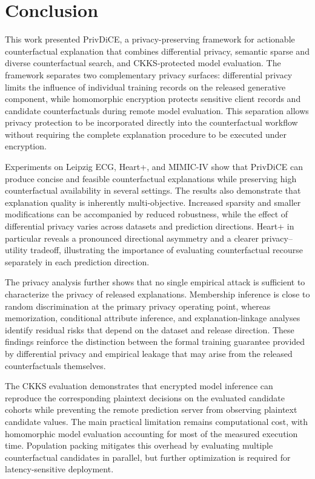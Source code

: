 \documentclass[preprint,12pt]{elsarticle}
\begin{document}
\section{Conclusion}
\label{sec:conclusion}

This work presented PrivDiCE, a privacy-preserving framework for
actionable counterfactual explanation that combines differential privacy,
semantic sparse and diverse counterfactual search, and CKKS-protected model
evaluation. The framework separates two complementary privacy surfaces:
differential privacy limits the influence of individual training records on the
released generative component, while homomorphic encryption protects sensitive
client records and candidate counterfactuals during remote model evaluation.
This separation allows privacy protection to be incorporated directly into the
counterfactual workflow without requiring the complete explanation procedure to
be executed under encryption.

Experiments on Leipzig ECG, Heart+, and MIMIC-IV show that PrivDiCE can produce
concise and feasible counterfactual explanations while preserving high
counterfactual availability in several settings. The results also demonstrate
that explanation quality is inherently multi-objective. Increased sparsity and
smaller modifications can be accompanied by reduced robustness, while the
effect of differential privacy varies across datasets and prediction
directions. Heart+ in particular reveals a pronounced directional asymmetry and
a clearer privacy--utility tradeoff, illustrating the importance of evaluating
counterfactual recourse separately in each prediction direction.

The privacy analysis further shows that no single empirical attack is sufficient
to characterize the privacy of released explanations. Membership inference is
close to random discrimination at the primary privacy operating point, whereas
memorization, conditional attribute inference, and explanation-linkage analyses
identify residual risks that depend on the dataset and release direction. These
findings reinforce the distinction between the formal training guarantee
provided by differential privacy and empirical leakage that may arise from the
released counterfactuals themselves.

The CKKS evaluation demonstrates that encrypted model inference can reproduce
the corresponding plaintext decisions on the evaluated candidate cohorts while
preventing the remote prediction server from observing plaintext candidate
values. The main practical limitation remains computational cost, with
homomorphic model evaluation accounting for most of the measured execution
time. Population packing mitigates this overhead by evaluating multiple
counterfactual candidates in parallel, but further optimization is required for
latency-sensitive deployment.
\end{document}
